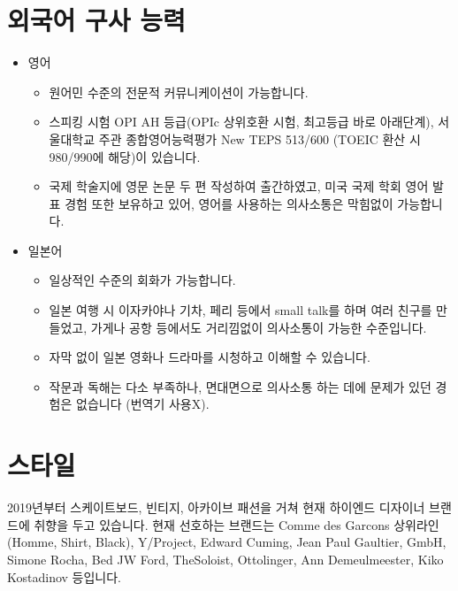 \section*{외국어 구사 능력}
\begin{itemize}
    \item 영어
          \begin{itemize}
              \item 원어민 수준의 전문적 커뮤니케이션이 가능합니다.
              \item 스피킹 시험 OPI AH 등급(OPIc 상위호환 시험, 최고등급 바로 아래단계), 서울대학교 주관 종합영어능력평가 New TEPS 513/600 (TOEIC 환산 시 980/990에 해당)이 있습니다.
              \item 국제 학술지에 영문 논문 두 편 작성하여 출간하였고, 미국 국제 학회 영어 발표 경험 또한 보유하고 있어, 영어를 사용하는 의사소통은 막힘없이 가능합니다.
          \end{itemize}
    \item 일본어
          \begin{itemize}
              \item 일상적인 수준의 회화가 가능합니다.
              \item 일본 여행 시 이자카야나 기차, 페리 등에서 small talk를 하며 여러 친구를 만들었고, 가게나 공항 등에서도 거리낌없이 의사소통이 가능한 수준입니다.
              \item 자막 없이 일본 영화나 드라마를 시청하고 이해할 수 있습니다.
              \item 작문과 독해는 다소 부족하나, 면대면으로 의사소통 하는 데에 문제가 있던 경험은 없습니다 (번역기 사용X).
          \end{itemize}
\end{itemize}

\section*{스타일}
2019년부터 스케이트보드, 빈티지, 아카이브 패션을 거쳐 현재 하이엔드 디자이너 브랜드에 취향을 두고 있습니다.
현재 선호하는 브랜드는 Comme des Garcons 상위라인(Homme, Shirt, Black), Y/Project, Edward Cuming, Jean Paul Gaultier, GmbH, Simone Rocha, Bed JW Ford, TheSoloist, Ottolinger, Ann Demeulmeester, Kiko Kostadinov 등입니다.

